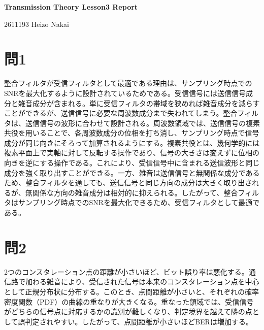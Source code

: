 \documentclass[uplatex,dvipdfmx,11pt,a4paper]{bxjsarticle}
\begin{document}
\begin{center}
{\LARGE \textbf{Transmission Theory Lesson3 Report}}
\end{center}

\vspace{1em}

\begin{flushright}
2611193 Heizo Nakai
\end{flushright}

\section*{問1}

整合フィルタが受信フィルタとして最適である理由は、サンプリング時点でのSNRを最大化するように設計されているためである。受信信号には送信信号成分と雑音成分が含まれる。単に受信フィルタの帯域を狭めれば雑音成分を減らすことができるが、送信信号に必要な周波数成分まで失われてしまう。整合フィルタは、送信信号の波形に合わせて設計される。周波数領域では、送信信号の複素共役を用いることで、各周波数成分の位相を打ち消し、サンプリング時点で信号成分が同じ向きにそろって加算されるようにする。複素共役とは、幾何学的には複素平面上で実軸に対して反転する操作であり、信号の大きさは変えずに位相の向きを逆にする操作である。これにより、受信信号中に含まれる送信波形と同じ成分を強く取り出すことができる。一方、雑音は送信信号と無関係な成分であるため、整合フィルタを通しても、送信信号と同じ方向の成分は大きく取り出されるが、無関係な方向の雑音成分は相対的に抑えられる。したがって、整合フィルタはサンプリング時点でのSNRを最大化できるため、受信フィルタとして最適である。

\section*{問2}

2つのコンスタレーション点の距離が小さいほど、ビット誤り率は悪化する。通信路で加わる雑音により、受信された信号は本来のコンスタレーション点を中心として正規分布状に分布する。このとき、点間距離が小さいと、それぞれの確率密度関数（PDF）の曲線の重なりが大きくなる。重なった領域では、受信信号がどちらの信号点に対応するかの識別が難しくなり、判定境界を越えて隣の点として誤判定されやすい。したがって、点間距離が小さいほどBERは増加する。
\end{document}
